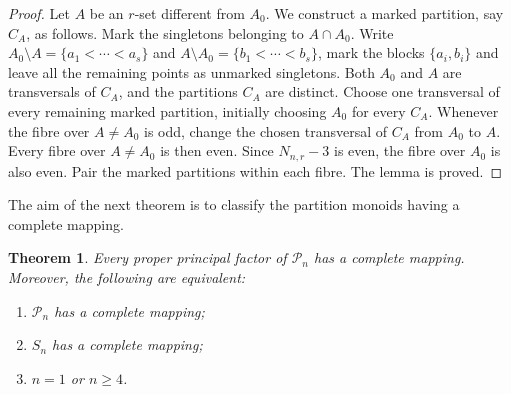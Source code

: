 \documentclass[11pt]{article}
\theoremstyle{plain}
\newtheorem{theorem}{Theorem}[section]
\theoremstyle{remark}
\theoremstyle{definition}
\theoremstyle{plain}
\begin{document}
\begin{proof}
Let $A$ be an $r$-set different from $A_0$. We construct a marked partition,
say $C_A$, as follows. Mark the singletons belonging to $A\cap A_0$. Write
$A_0\setminus A=\{a_1<\cdots<a_s\}$ and
$A\setminus A_0=\{b_1<\cdots<b_s\}$, mark the blocks $\{a_i,b_i\}$ and
leave all the remaining points as unmarked singletons. Both $A_0$ and $A$
are transversals of $C_A$, and the partitions $C_A$ are distinct. Choose one
transversal of every remaining marked partition, initially choosing $A_0$
for every $C_A$. Whenever the fibre over $A\ne A_0$ is odd, change the
chosen transversal of $C_A$ from $A_0$ to $A$. Every fibre over
$A\ne A_0$ is then even. Since $N_{n,r}-3$ is even, the fibre over $A_0$
is also even. Pair the marked partitions within each fibre. The lemma is
proved.
\end{proof}

The aim of the next theorem is to classify the partition monoids having a
complete mapping.

\begin{theorem}\label{t:partition-monoid}
Every proper principal factor of $\mathcal P_n$ has a complete mapping.
Moreover, the following are equivalent:
\begin{enumerate}
\item $\mathcal P_n$ has a complete mapping;
\item $S_n$ has a complete mapping;
\item $n=1$ or $n\ge4$.
\end{enumerate}
\end{theorem}
\end{document}
